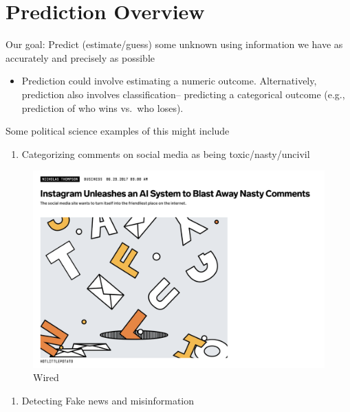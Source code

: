 \documentclass[
  letterpaper,
  DIV=11,
  numbers=noendperiod]{scrreprt}
\providecommand{\tightlist}{%
  \setlength{\itemsep}{0pt}\setlength{\parskip}{0pt}}\usepackage{longtable,booktabs,array}
\begin{document}
\hypertarget{prediction-overview}{%
\section{Prediction Overview}\label{prediction-overview}}

Our goal: Predict (estimate/guess) some unknown using information we
have as accurately and precisely as possible

\begin{itemize}
\tightlist
\item
  Prediction could involve estimating a numeric outcome. Alternatively,
  prediction also involves classification-- predicting a categorical
  outcome (e.g., prediction of who wins vs.~who loses).
\end{itemize}

Some political science examples of this might include

\begin{enumerate}
\def\labelenumi{\arabic{enumi}.}
\tightlist
\item
  Categorizing comments on social media as being toxic/nasty/uncivil
\end{enumerate}

\begin{figure}

{\centering \includegraphics{images/instagramhate.png}

}

\caption{Wired}

\end{figure}

\begin{enumerate}
\def\labelenumi{\arabic{enumi}.}
\setcounter{enumi}{1}
\tightlist
\item
  Detecting Fake news and misinformation
\end{enumerate}
\end{document}
